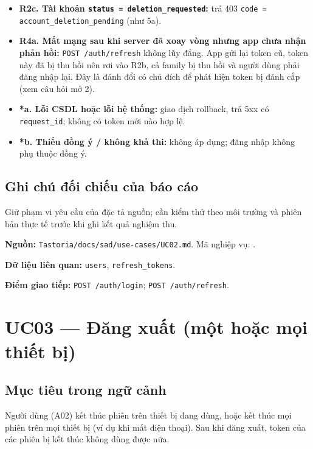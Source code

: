 \begin{itemize}
\item \textbf{R2c. Tài khoản {\small\texttt{status = deletion\_\allowbreak{}\allowbreak{}requested}}:} trả 403 {\small\texttt{code = account\_\allowbreak{}\allowbreak{}deletion\_\allowbreak{}\allowbreak{}pending}} (như 5a).
\item \textbf{R4a. Mất mạng sau khi server đã xoay vòng nhưng app chưa nhận phản hồi:} {\small\texttt{POST /\allowbreak{}\allowbreak{}auth/\allowbreak{}\allowbreak{}refresh}} không lũy đẳng. App gửi lại token cũ, token này đã bị thu hồi nên rơi vào R2b, cả family bị thu hồi và người dùng phải đăng nhập lại. Đây là đánh đổi có chủ đích để phát hiện token bị đánh cắp (xem câu hỏi mở 2).
\item \textbf{*a. Lỗi CSDL hoặc lỗi hệ thống:} giao dịch rollback, trả 5xx có {\small\texttt{request\_\allowbreak{}\allowbreak{}id}}; không có token mới nào hợp lệ.
\item \textbf{*b. Thiếu đồng ý /\allowbreak{} không khả thi:} không áp dụng; đăng nhập không phụ thuộc đồng ý.
\end{itemize}
\subsection{Ghi chú đối chiếu của báo cáo}
Giữ phạm vi yêu cầu của đặc tả nguồn; cần kiểm thử theo môi trường và phiên bản thực tế trước khi ghi kết quả nghiệm thu.

\textbf{Nguồn:} {\small\texttt{Tastoria/\allowbreak{}\allowbreak{}docs/\allowbreak{}\allowbreak{}sad/\allowbreak{}\allowbreak{}use-\allowbreak{}cases/\allowbreak{}\allowbreak{}UC02.\allowbreak{}md}}. Mã nghiệp vụ: .

\textbf{Dữ liệu liên quan:} {\small\texttt{users}}, {\small\texttt{refresh\_\allowbreak{}\allowbreak{}tokens}}.

\textbf{Điểm giao tiếp:} {\small\texttt{POST /\allowbreak{}\allowbreak{}auth/\allowbreak{}\allowbreak{}login}}; {\small\texttt{POST /\allowbreak{}\allowbreak{}auth/\allowbreak{}\allowbreak{}refresh}}.

\section{UC03 --- Đăng xuất (một hoặc mọi thiết bị)}
\subsection{Mục tiêu trong ngữ cảnh}
Người dùng (A02) kết thúc phiên trên thiết bị đang dùng, hoặc kết thúc mọi phiên trên mọi thiết bị (ví dụ khi mất điện thoại). Sau khi đăng xuất, token của các phiên bị kết thúc không dùng được nữa.

